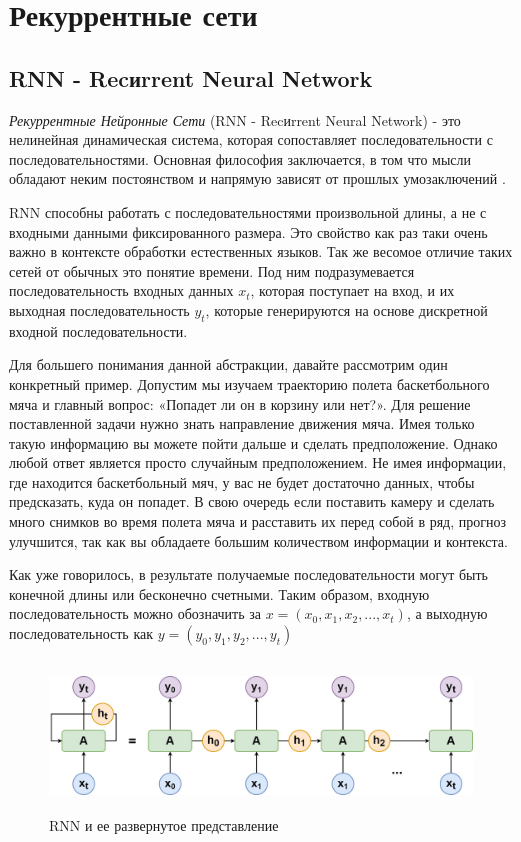 	\section{Рекуррентные сети}
	
	\subsection{RNN - Recиrrent Neural Network}
	
	\textit{Рекуррентные Нейронные Сети} (RNN - Recиrrent Neural Network) - это нелинейная динамическая система, которая сопоставляет последовательности с последовательностями. Основная философия заключается, в том что мысли обладают неким постоянством и напрямую зависят от прошлых умозаключений \cite{20}. 
	
	RNN способны работать с последовательностями произвольной длины, а не с входными данными фиксированного размера. Это свойство как раз таки очень важно в контексте обработки естественных языков. Так же весомое отличие таких сетей от обычных это понятие времени. Под ним подразумевается последовательность входных данных $x_t$, которая поступает на вход, и их выходная последовательность $y_t$, которые генерируются на основе дискретной входной последовательности. 
	
	Для большего понимания данной абстракции, давайте рассмотрим один конкретный пример. Допустим мы изучаем траекторию полета баскетбольного мяча и главный вопрос: «Попадет ли он в корзину или нет?». Для решение поставленной задачи нужно знать направление движения мяча. Имея только такую информацию вы можете пойти дальше и сделать предположение. Однако любой ответ является просто случайным предположением. Не имея информации, где находится баскетбольный мяч, у вас не будет достаточно данных, чтобы предсказать, куда он попадет. В свою очередь если поставить камеру и сделать много снимков во время полета мяча и расставить их перед собой в ряд, прогноз улучшится, так как вы обладаете большим количеством информации и контекста.
	
	Как уже говорилось, в результате получаемые последовательности могут быть конечной длины или бесконечно счетными. Таким образом, входную последовательность можно обозначить за $x = (x_0, x_1, x_2, ... , x_t)$, а выходную последовательность как $y = (y_0, y_1, y_2, ... , y_t)$
	
	\begin{figure}[ht!]
		\centering
		\captionsetup{justification=centering}
		\includegraphics[height=40mm]{img/RNN и ее развернутое представление.png}
		\caption{RNN и ее развернутое представление}
	\end{figure}
	
